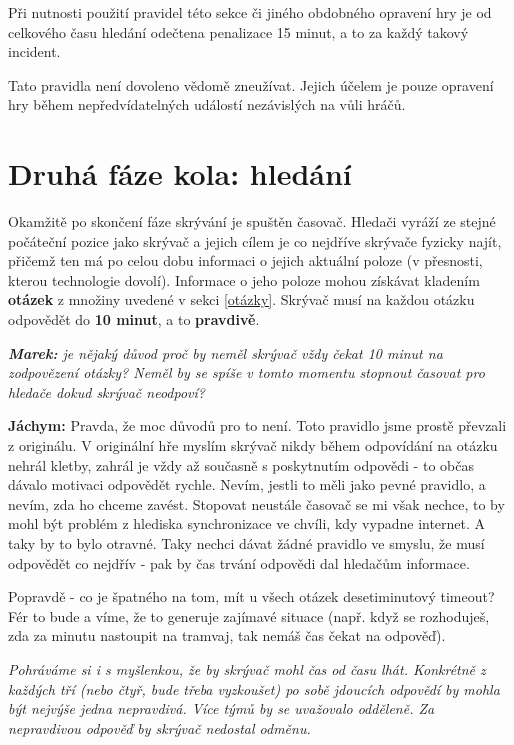 \documentclass{book}
\newenvironment{reasoning}{\begin{small}\itshape}{\end{small}}
\def\timepenalty/{15 minut}
\def\timeanswerquestion/{10 minut}  %
\begin{document}
Při nutnosti použití pravidel této sekce či jiného obdobného opravení hry je od celkového času hledání odečtena penalizace \timepenalty/, a to za každý takový incident.

Tato pravidla není dovoleno vědomě zneužívat. Jejich účelem je pouze opravení hry během nepředvídatelných událostí nezávislých na vůli hráčů.

\section{Druhá fáze kola: hledání}

Okamžitě po skončení fáze skrývání je spuštěn časovač. Hledači vyráží ze stejné počáteční pozice jako skrývač a jejich cílem je co nejdříve skrývače fyzicky najít, přičemž ten má po celou dobu informaci o jejich aktuální poloze (v přesnosti, kterou technologie dovolí). Informace o jeho poloze mohou získávat kladením \textbf{otázek} z množiny uvedené v sekci \ref{otázky}. Skrývač musí na každou otázku odpovědět do \textbf{\timeanswerquestion/}, a to \textbf{pravdivě}.

\begin{reasoning}
	\textbf{Marek:} je nějaký důvod proč by neměl skrývač vždy čekat 10 minut na zodpovězení otázky? Neměl by se spíše v tomto momentu stopnout časovat pro hledače dokud skrývač neodpoví?

	\textbf{Jáchym:} Pravda, že moc důvodů pro to není. Toto pravidlo jsme prostě převzali z originálu. V originální hře myslím skrývač nikdy během odpovídání na otázku nehrál kletby, zahrál je vždy až současně s poskytnutím odpovědi - to občas dávalo motivaci odpovědět rychle. Nevím, jestli to měli jako pevné pravidlo, a nevím, zda ho chceme zavést. Stopovat neustále časovač se mi však nechce, to by mohl být problém z hlediska synchronizace ve chvíli, kdy vypadne internet. A taky by to bylo otravné. Taky nechci dávat žádné pravidlo ve smyslu, že musí odpovědět co nejdřív - pak by čas trvání odpovědi dal hledačům informace.

	Popravdě - co je špatného na tom, mít u všech otázek desetiminutový timeout? Fér to bude a víme, že to generuje zajímavé situace (např. když se rozhoduješ, zda za minutu nastoupit na tramvaj, tak nemáš čas čekat na odpověď).
\end{reasoning}

\begin{reasoning}
	Pohráváme si i s myšlenkou, že by skrývač mohl čas od času lhát. Konkrétně z každých tří (nebo čtyř, bude třeba vyzkoušet) po sobě jdoucích odpovědí by mohla být nejvýše jedna nepravdivá. Více týmů by se uvažovalo odděleně. Za nepravdivou odpověď by skrývač nedostal odměnu.
\end{reasoning}
\end{document}
